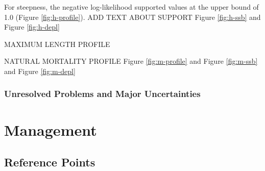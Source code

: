 \documentclass[11pt,
  english,
  a4paper,
]{article}
\begin{document}
\leavevmode\tagmcend\tagstructend\par


For steepness, the negative log-likelihood supported values at the upper bound of 1.0 (Figure \ref{fig:h-profile}). ADD TEXT ABOUT SUPPORT Figure \ref{fig:h-ssb} and Figure \ref{fig:h-depl}

\leavevmode\tagmcend\tagstructend\par


MAXIMUM LENGTH PROFILE

\leavevmode\tagmcend\tagstructend\par


NATURAL MORTALITY PROFILE Figure \ref{fig:m-profile} and Figure \ref{fig:m-ssb} and Figure \ref{fig:m-depl}

\leavevmode\tagmcend\tagstructend\par


\hypertarget{unresolved-problems-and-major-uncertainties}{%
\subsubsection{Unresolved Problems and Major Uncertainties}\label{unresolved-problems-and-major-uncertainties}}

\leavevmode\tagmcend\tagstructend


\hypertarget{management}{%
\section{Management}\label{management}}

\leavevmode\tagmcend\tagstructend


\hypertarget{reference-points-1}{%
\subsection{Reference Points}\label{reference-points-1}}

\leavevmode\tagmcend\tagstructend

\end{document}

